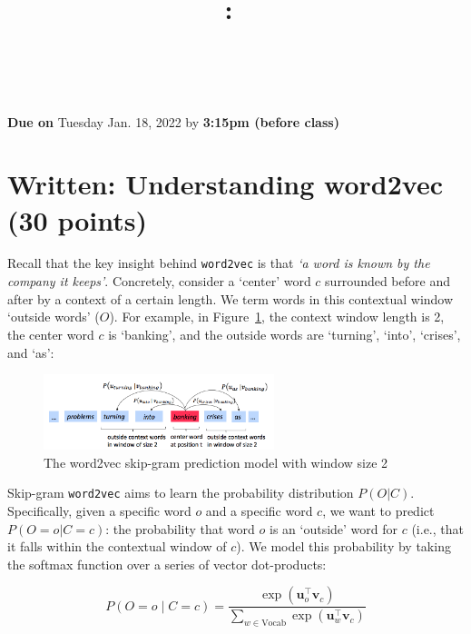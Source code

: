 \documentclass{article}
\title{
\vspace{-1in}
\textmd{\textbf{\hmwkClass:\ \hmwkTitle} \\ \hmwkAuthorName}\\
}
\author{}
\date{}
\begin{document}
\maketitle
\vspace{-.7in}

\begin{center}
    \large{\textbf{Due on} Tuesday Jan. 18, 2022 by \textbf{3:15pm (before class)}}
\end{center}

\section{Written: Understanding word2vec (30 points)}
Recall that the key insight behind {\tt word2vec} is that \textit{`a word is known by the company it keeps'}. Concretely, consider a `center' word $c$ surrounded before and after by a context of a certain length. We term words in this contextual window `outside words' ($O$). For example, in Figure~\ref{fig:word2vec}, the context window length is 2, the center word $c$ is `banking', and the outside words are `turning', `into', `crises', and `as':

\begin{figure}[h]
    \centering
    \includegraphics[width=0.6\textwidth]{word2vec.png}
    \caption{The word2vec skip-gram prediction model with window size 2}
    \label{fig:word2vec}
\end{figure}

Skip-gram {\tt word2vec} aims to learn the probability distribution $P(O|C)$. 
Specifically, given a specific word $o$ and a specific word $c$, we want to predict $P(O=o|C=c)$: the probability that word $o$ is an `outside' word for $c$ (i.e., that it falls within the contextual window of $c$).
We model this probability by taking the softmax function over a series of vector dot-products: %

\begin{equation}
 P(O=o \mid C=c) = \frac{\exp(\bm u_{o}^\top \bm v_c)}{\sum_{w \in \text{Vocab}} \exp(\bm u_{w}^\top \bm v_c)}
 \label{word2vec_condprob}
\end{equation}
\end{document}
